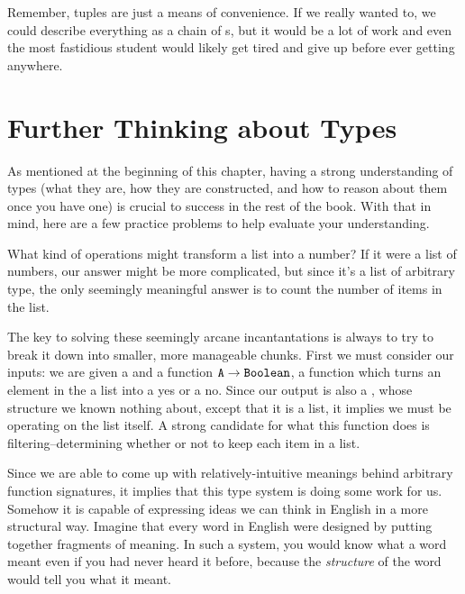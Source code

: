 Remember, tuples are just a means of convenience. If we really wanted to, we could describe everything as a chain of
s, but it would be a lot of work and even the most fastidious student would likely get tired and give up
before ever getting anywhere.


\section{Further Thinking about Types}
As mentioned at the beginning of this chapter, having a strong understanding of types (what they are, how they are
constructed, and how to reason about them once you have one) is crucial to success in the rest of the book. With that in
mind, here are a few practice problems to help evaluate your understanding.

{What kind of operations might transform a list into a number? If it were a list of numbers, our answer might be more
complicated, but since it's a list of arbitrary type, the only seemingly meaningful answer is to count the number of
items in the list.}

{The key to solving these seemingly arcane incantantations is always to try to break it down into smaller, more
    manageable chunks. First we must consider our inputs: we are given a  and a function $\text{\texttt{A}} \to
    \text{\texttt{Boolean}}$, a function which turns an element in the a list into a yes or a no. Since our output is also a
    , whose structure we known nothing about, except that it is a list, it implies we must be operating on
    the list itself. A strong candidate for what this function does is filtering--determining whether or not to keep
    each item in a list.}

Since we are able to come up with relatively-intuitive meanings behind arbitrary function signatures, it implies that
this type system is doing some work for us. Somehow it is capable of expressing ideas we can think in English in a more
structural way. Imagine that every word in English were designed by putting together fragments of meaning. In such a
system, you would know what a word meant even if you had never heard it before, because the \textit{structure} of the
word would tell you what it meant.

